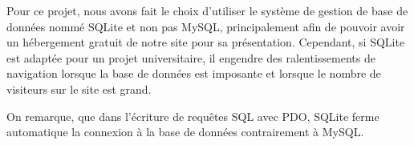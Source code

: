         \bigskip
        Pour ce projet, nous avons fait le choix d'utiliser le système de gestion de base de données nommé SQLite et non pas MySQL, principalement afin de pouvoir avoir un hébergement gratuit de notre site pour sa présentation. Cependant, si SQLite est adaptée pour un projet universitaire, il engendre des ralentissements de navigation lorsque la base de données est imposante et lorsque le nombre de visiteurs sur le site est grand.

        \medskip
        On remarque, que dans l'écriture de requêtes SQL avec PDO, SQLite ferme automatique la connexion à la base de données contrairement à MySQL.
